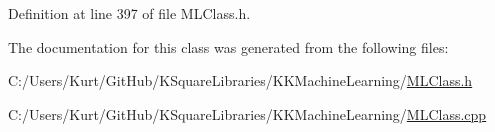 Definition at line 397 of file M\+L\+Class.\+h.



The documentation for this class was generated from the following files\+:\begin{DoxyCompactItemize}
\item 
C\+:/\+Users/\+Kurt/\+Git\+Hub/\+K\+Square\+Libraries/\+K\+K\+Machine\+Learning/\hyperlink{_m_l_class_8h}{M\+L\+Class.\+h}\item 
C\+:/\+Users/\+Kurt/\+Git\+Hub/\+K\+Square\+Libraries/\+K\+K\+Machine\+Learning/\hyperlink{_m_l_class_8cpp}{M\+L\+Class.\+cpp}\end{DoxyCompactItemize}
